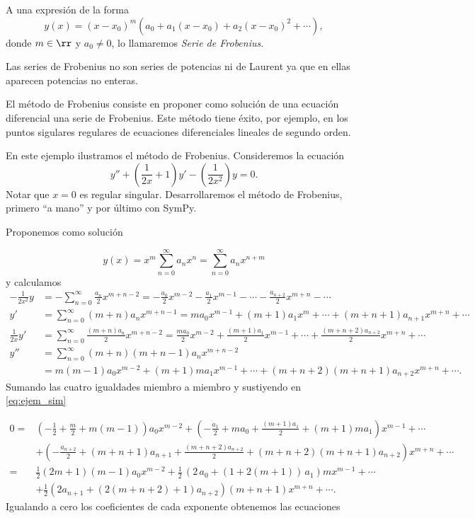 \begin{definicion}{} A una expresión de la forma
 \[y(x)=(x-x_0)^m(a_0+a_1(x-x_0)+a_2(x-x_0)^2+\cdots),\]
donde $m\in\rr$ y $a_0\neq 0$, lo llamaremos \emph{Serie de Frobenius}.
\end{definicion}
Las series de Frobenius no son series de potencias ni de Laurent ya que en ellas aparecen potencias no enteras.

El método de Frobenius consiste en proponer como solución de una ecuación diferencial una serie de Frobenius. Este método tiene éxito, por ejemplo, en los puntos sigulares regulares de ecuaciones diferenciales lineales de segundo orden.

\begin{ejemplo}{} En este ejemplo ilustramos el método de Frobenius. Consideremos la ecuación
\begin{equation}\label{eq:ejem_sim}y''+\left(\frac{1}{2x}+1\right)y'-\left(\frac{1}{2x^2}\right)y=0.
\end{equation}
Notar que $x=0$ es regular singular. Desarrollaremos el método de Frobenius, primero ``a mano'' y por último con SymPy.

Proponemos como solución

 \[y(x)=x^m\sum_{n=0}^{\infty}a_{n}x^n=\sum_{n=0}^{\infty}a_{n}x^{n+m}\]
y calculamos
\[
    \begin{split}
     -\frac{1}{2x^2}y&=-\sum_{n=0}^{\infty}\frac{a_n}{2}x^{m+n-2}=-\frac{a_0}{2}x^{m-2}
-\frac{a_1}{2}x^{m-1}-\cdots-\frac{a_{n+2}}{2}x^{m+n}-\cdots\\
      y'&=\sum_{n=0}^{\infty}(m+n)a_{n}x^{m+n-1}=ma_0x^{m-1}+(m+1)a_1x^m+\cdots+(m+n+1)a_{n+1}x^{m+n}+\cdots\\
      \frac{1}{2x}y'&=\sum_{n=0}^{\infty}\frac{(m+n)a_{n}}{2}x^{m+n-2}=\frac{ma_0}{2}x^{m-2}+\frac{(m+1)a_1}{2}x^{m-1}+\cdots+\frac{(m+n+2)a_{n+2}}{2}x^{m+n}+\cdots\\
      y''&=\sum_{n=0}^{\infty}(m+n)(m+n-1)a_{n}x^{m+n-2}\\
&= m(m-1)a_0x^{m-2}+(m+1)ma_1x^{m-1}+\cdots+(m+n+2)(m+n+1)a_{n+2}x^{m+n}+\cdots.
    \end{split}
\]
Sumando las cuatro igualdades miembro a miembro y sustiyendo en \eqref{eq:ejem_sim}

\[
  \begin{split}
    0=& \left(-\frac{1}{2} +\frac{m}{2}+m(m-1)\right)a_0x^{m-2}  + \left(-\frac{a_1}{2}+ma_0+\frac{(m+1)a_1}{2}+ (m+1)ma_1 \right)x^{m-1}+\cdots \\
  &+\left( -\frac{a_{n+2}}{2}+(m+n+1)a_{n+1}+ \frac{(m+n+2)a_{n+2}}{2}+(m+n+2)(m+n+1)a_{n+2} \right)x^{m+n}+\cdots\\
 =&\frac12\left(2m+1\right)(m-1) a_0x^{m-2}+ \frac{1}{2} \, {\left( 2 \, a_{0} + (1+2(m+1))\, a_{1}\right)}m x^{m-1}+\cdots\\
 &+\frac12\left(   2a_{n+1}+ (2(m+n+2)+1)a_{n+2}  \right)(m+n+1)x^{m+n}+\cdots.
  \end{split}
\]
Igualando a cero los coeficientes de cada exponente obtenemos las ecuaciones


\end{ejemplo}
